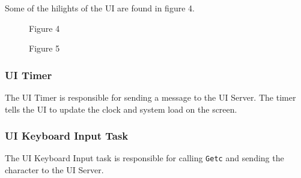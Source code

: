 \documentclass[letterpaper]{article}
\begin{document}
Some of the hilights of the UI are found in figure 4.
\begin{figure}
\noindent{}
\caption{Figure 4}
\end{figure}
\begin{figure}
\noindent{}
\caption{Figure 5}
\end{figure}


\subsubsection{UI Timer%
  \label{ui-timer}%
}

The UI Timer is responsible for sending a message to the UI Server. The timer tells the UI to update the clock and system load on the screen.


\subsubsection{UI Keyboard Input Task%
  \label{ui-keyboard-input-task}%
}

The UI Keyboard Input task is responsible for calling \texttt{Getc} and sending the character to the UI Server.
\end{document}
